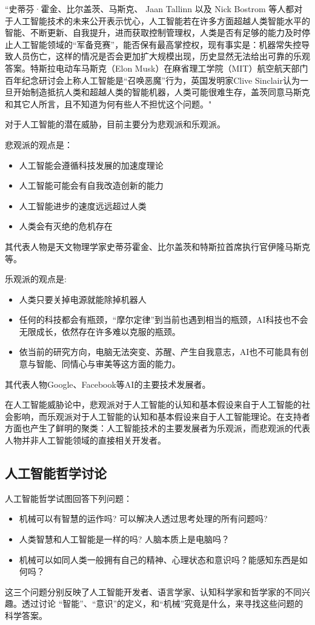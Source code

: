 \documentclass[fontset=fandol,UTF8]{article}
\begin{document}
“史蒂芬·霍金、比尔盖茨、马斯克、 Jaan Tallinn 以及 Nick Bostrom 等人都对于人工智能技术的未来公开表示忧心，人工智能若在许多方面超越人类智能水平的智能、不断更新、自我提升，进而获取控制管理权，人类是否有足够的能力及时停止人工智能领域的“军备竞赛”，能否保有最高掌控权，现有事实是：机器常失控导致人员伤亡，这样的情况是否会更加扩大规模出现，历史显然无法给出可靠的乐观答案。特斯拉电动车马斯克（Elon Musk）在麻省理工学院（MIT）航空航天部门百年纪念研讨会上称人工智能是“召唤恶魔”行为，英国发明家Clive Sinclair认为一旦开始制造抵抗人类和超越人类的智能机器，人类可能很难生存，盖茨同意马斯克和其它人所言，且不知道为何有些人不担忧这个问题。"\cite{wikiai}

对于人工智能的潜在威胁，目前主要分为悲观派和乐观派。

悲观派的观点是\cite{wikiai}：
\begin{itemize}
\item 人工智能会遵循科技发展的加速度理论
\item 人工智能可能会有自我改造创新的能力
\item 人工智能进步的速度远远超过人类
\item 人类会有灭绝的危机存在
\end{itemize}
其代表人物是天文物理学家史蒂芬霍金、比尔盖茨和特斯拉首席执行官伊隆马斯克等。

乐观派的观点是\cite{wikiai}:
\begin{itemize}
\item 人类只要关掉电源就能除掉机器人
\item 任何的科技都会有瓶颈，“摩尔定律”到当前也遇到相当的瓶颈，AI科技也不会无限成长，依然存在许多难以克服的瓶颈。
\item 依当前的研究方向，电脑无法突变、苏醒、产生自我意志，AI也不可能具有创意与智能、同情心与审美等这方面的能力。
\end{itemize}
其代表人物Google、Facebook等AI的主要技术发展者。

在人工智能威胁论中，悲观派对于人工智能的认知和基本假设来自于人工智能的社会影响，而乐观派对于人工智能的认知和基本假设来自于人工智能理论。在支持者方面也产生了鲜明的聚类：人工智能技术的主要发展者为乐观派，而悲观派的代表人物并非人工智能领域的直接相关开发者。

\subsection{人工智能哲学讨论}
人工智能哲学试图回答下列问题\cite{wikihp}：
\begin{itemize}
\item 机械可以有智慧的运作吗? 可以解决人透过思考处理的所有问题吗?
\item 人类智慧和人工智能是一样的吗? 人脑本质上是电脑吗？
\item 机械可以如同人类一般拥有自己的精神、心理状态和意识吗？能感知东西是如何吗？
\end{itemize}
这三个问题分别反映了人工智能开发者、语言学家、认知科学家和哲学家的不同兴趣。透过讨论 “智能”、“意识”的定义，和“机械”究竟是什么，来寻找这些问题的科学答案。
\end{document}
